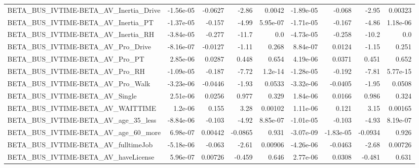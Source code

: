\begin{tabular}{lrrrrrrrr}
BETA\_BUS\_IVTIME-BETA\_AV\_Inertia\_Drive              &   -1.56e-05 &      -0.0627 &    -2.86 &   0.0042 &  -1.89e-05 &      -0.068 &        -2.95 &       0.00323 \\
BETA\_BUS\_IVTIME-BETA\_AV\_Inertia\_PT                 &   -1.37e-05 &       -0.157 &    -4.99 & 5.95e-07 &  -1.71e-05 &      -0.167 &        -4.86 &      1.18e-06 \\
BETA\_BUS\_IVTIME-BETA\_AV\_Inertia\_RH                 &   -3.84e-05 &       -0.277 &    -11.7 &      0.0 &  -4.73e-05 &      -0.258 &        -10.2 &           0.0 \\
BETA\_BUS\_IVTIME-BETA\_AV\_Pro\_Drive                  &   -8.16e-07 &      -0.0127 &    -1.11 &    0.268 &   8.84e-07 &      0.0124 &        -1.15 &         0.251 \\
BETA\_BUS\_IVTIME-BETA\_AV\_Pro\_PT                     &    2.85e-06 &       0.0287 &    0.448 &    0.654 &   4.19e-06 &      0.0371 &        0.451 &         0.652 \\
BETA\_BUS\_IVTIME-BETA\_AV\_Pro\_RH                     &   -1.09e-05 &       -0.187 &    -7.72 &  1.2e-14 &  -1.28e-05 &      -0.192 &        -7.81 &      5.77e-15 \\
BETA\_BUS\_IVTIME-BETA\_AV\_Pro\_Walk                   &   -3.23e-06 &      -0.0446 &    -1.93 &   0.0533 &  -3.32e-06 &     -0.0405 &        -1.95 &        0.0508 \\
BETA\_BUS\_IVTIME-BETA\_AV\_Single                     &    2.51e-06 &       0.0256 &    0.977 &    0.329 &   1.84e-06 &      0.0166 &        0.986 &         0.324 \\
BETA\_BUS\_IVTIME-BETA\_AV\_WAITTIME                   &     1.2e-06 &        0.155 &     3.28 &  0.00102 &   1.11e-06 &       0.121 &         3.15 &       0.00165 \\
BETA\_BUS\_IVTIME-BETA\_AV\_age\_35\_less                &   -8.84e-06 &       -0.103 &    -4.92 & 8.85e-07 &  -1.01e-05 &      -0.103 &        -4.93 &      8.19e-07 \\
BETA\_BUS\_IVTIME-BETA\_AV\_age\_60\_more                &    6.98e-07 &      0.00442 &  -0.0865 &    0.931 &  -3.07e-09 &   -1.83e-05 &      -0.0934 &         0.926 \\
BETA\_BUS\_IVTIME-BETA\_AV\_fulltimeJob                &   -5.18e-06 &       -0.063 &    -2.61 &  0.00906 &  -4.26e-06 &     -0.0463 &        -2.68 &       0.00726 \\
BETA\_BUS\_IVTIME-BETA\_AV\_haveLicense                &    5.96e-07 &      0.00726 &   -0.459 &    0.646 &   2.77e-06 &      0.0308 &       -0.481 &         0.631 \\

\end{tabular}
